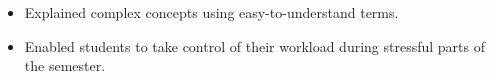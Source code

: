 \documentclass[10pt,a4paper]{altacv}
\begin{document}



\begin{itemize}
\item Explained complex concepts using easy-to-understand terms. 
\item Enabled students to take control of their workload during stressful parts of the semester.  
\end{itemize}




\end{document}

